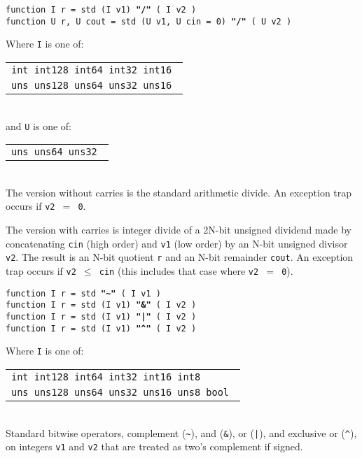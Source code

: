 \documentclass[12pt]{article}
\newcommand{\ttkey}[1]{{\tt \bfseries #1}}
\newenvironment{indpar}[1][0.3in]%
	{\begin{list}{}%
		     {\setlength{\itemsep}{0in}%
		      \setlength{\topsep}{0in}%
		      \setlength{\parsep}{1ex}%
		      \setlength{\labelwidth}{#1}%
		      \setlength{\leftmargin}{#1}%
		      \addtolength{\leftmargin}{\labelsep}}%
	 \item}%
	{\end{list}}
\begin{document}
{\tt function I r = std (I v1) \ttkey{"/"} ( I v2 )} \\
{\tt function U r, U cout = std (U v1, U cin = 0) \ttkey{"/"} ( U v2 )}
\begin{indpar}
Where {\tt I} is one of:
	\begin{tabular}[t]{l}
	\tt int  int128 int64  int32  int16 \\
	\tt uns  uns128 uns64  uns32  uns16 \\
	\end{tabular}
\\[1ex]
and {\tt U} is one of:
	\begin{tabular}[t]{l}
	\tt uns  uns64  uns32 \\
	\end{tabular}
\\[1ex]
The version without carries is the standard arithmetic divide.
An exception trap occurs if {\tt v2 $=$ 0}.

The version with carries is integer divide of a 2N-bit unsigned
dividend made by concatenating {\tt cin} (high order) and
{\tt v1} (low order) by an N-bit unsigned divisor {\tt v2}.  The result
is an N-bit quotient {\tt r} and an N-bit remainder {\tt cout}.
An exception trap occurs if {\tt v2 $\leq$ cin} (this includes
that case where {\tt v2 $=$ 0}).

\end{indpar}

{\tt function I r = std        \ttkey{"\textasciitilde"} ( I v1 )} \\
{\tt function I r = std (I v1) \ttkey{"\&"} ( I v2 )} \\
{\tt function I r = std (I v1) \ttkey{"|"} ( I v2 )} \\
{\tt function I r = std (I v1) \ttkey{"\textasciicircum"} ( I v2 )}
\begin{indpar}
Where {\tt I} is one of:
	\begin{tabular}[t]{l}
	\tt int  int128 int64  int32  int16 int8 \\
	\tt uns  uns128 uns64  uns32  uns16 uns8 bool \\
	\end{tabular}
\\[1ex]
Standard bitwise operators, complement ({\tt \textasciitilde}),
and ({\tt \&}), or ({\tt |}), and exclusive or ({\tt \textasciicircum}),
on integers {\tt v1} and {\tt v2}
that are treated as two's complement if signed.
\end{indpar}
\end{document}
